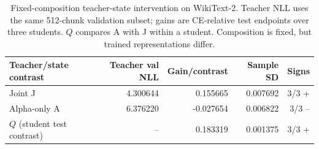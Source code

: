 \begin{table}[htbp]
\centering\small
\begin{tabular}{lrrrr}
\toprule
Teacher/state contrast & Teacher val NLL & Gain/contrast & Sample SD & Signs \\
\midrule
Joint J & 4.300644 & 0.155665 & 0.007692 & 3/3 + \\
Alpha-only A & 6.376220 & -0.027654 & 0.006822 & 3/3 -- \\
$Q$ (student test contrast) & -- & 0.183319 & 0.001375 & 3/3 + \\
\bottomrule
\end{tabular}
\caption{Fixed-composition teacher-state intervention on WikiText-2. Teacher NLL uses the same 512-chunk validation subset; gains are CE-relative test endpoints over three students. $Q$ compares A with J within a student. Composition is fixed, but trained representations differ.}
\label{tab:teacher_state}
\end{table}
